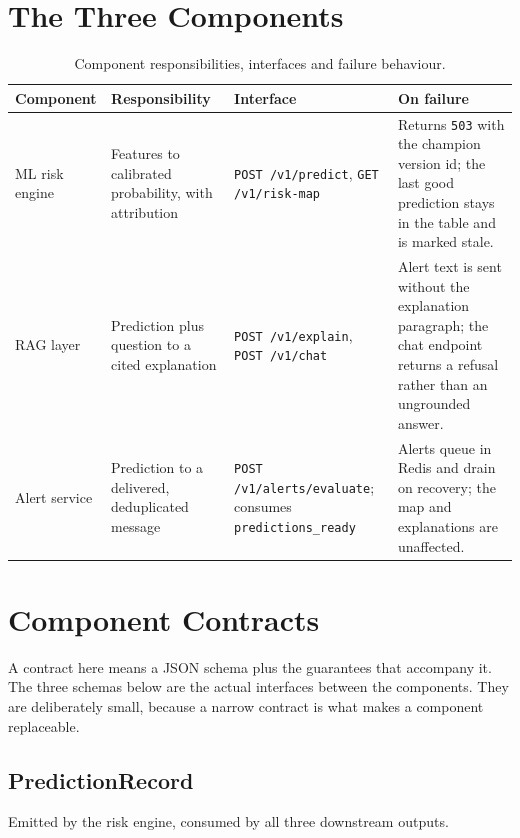 \documentclass[10pt,openany]{report}
\begin{document}
\section{The Three Components}

\begin{table}[htbp]
\centering
\caption{Component responsibilities, interfaces and failure behaviour.}
\label{tab:components}
\small
\begin{tabular}{@{}>{\raggedright\arraybackslash}p{2.35cm}>{\raggedright\arraybackslash}p{3.35cm}>{\raggedright\arraybackslash}p{3.5cm}>{\raggedright\arraybackslash}p{4.5cm}@{}}
\toprule
\textbf{Component} & \textbf{Responsibility} & \textbf{Interface} & \textbf{On failure} \\
\midrule
ML risk engine & Features to calibrated probability, with attribution & \texttt{POST /v1/predict}, \texttt{GET /v1/risk-map} & Returns \texttt{503} with the champion version id; the last good prediction stays in the table and is marked stale. \\
RAG layer & Prediction plus question to a cited explanation & \texttt{POST /v1/explain}, \texttt{POST /v1/chat} & Alert text is sent without the explanation paragraph; the chat endpoint returns a refusal rather than an ungrounded answer. \\
Alert service & Prediction to a delivered, deduplicated message & \texttt{POST /v1/alerts/evaluate}; consumes \texttt{predictions\_ready} & Alerts queue in Redis and drain on recovery; the map and explanations are unaffected. \\
\bottomrule
\end{tabular}
\end{table}

\section{Component Contracts}

A contract here means a JSON schema plus the guarantees that accompany it. The three schemas
below are the actual interfaces between the components. They are deliberately small, because a
narrow contract is what makes a component replaceable.

\subsection*{PredictionRecord}

Emitted by the risk engine, consumed by all three downstream outputs.
\end{document}

